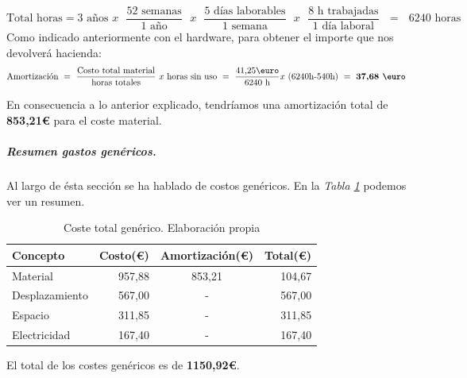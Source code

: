 \documentclass[12pt]{article}
\begin{document}
\begin{itemize}
         \begin{equation*}
                \text{Total horas} = \text{3 años }  x\text{ }  \frac{\text{52 semanas}}{\text{1 año}} \text{ }x\text{ } \frac{\text{5 días laborables}}{\text{1 semana}} \text{ }x\text{ } \frac{\text{8 h trabajadas}}{\text{1 día laboral}} \text{ }=\text{ } 6240 \text{ horas} 
            \end{equation*}
            Como indicado anteriormente con el hardware, para obtener el importe que nos devolverá hacienda:
            \begin{equation*}
                \text{Amortización } = \text{ }  \frac{\text{Costo total material}}{\text{horas totales}}\text{ }x\text{ horas sin uso} \text{ }=\text{ } \frac{\text{41,25\euro}}{\text{6240 h}}x\text{ (6240h-540h)} \text{ }= \text{ \textbf{37,68 \euro}}
            \end{equation*}
    \end{itemize}
    En consecuencia a lo anterior explicado, tendríamos una amortización total de \textbf{853,21\euro} para el coste material.
    
    

    \subparagraph{Resumen gastos genéricos.} Al largo de ésta sección se ha hablado de costos genéricos. En la \textit{Tabla \ref{tab:costos_genericos}} podemos ver un resumen.
        \begin{table}[H]
        \begin{center}
            \begin{tabular}{ |l|r|c|r| } \hline
                Concepto       & Costo(\euro) & Amortización(\euro) & Total(\euro)     \\ \hline
                Material       & 957,88       & 853,21              & 104,67             \\ \hline
                Desplazamiento & 567,00       & -                & 567,00            \\ \hline
                Espacio        & 311,85       & -                & 311,85            \\ \hline
                Electricidad   & 167,40       & -                & 167,40           \\ \hline
            \end{tabular}
        \caption{Coste total genérico. Elaboración propia}
        \label{tab:costos_genericos}
        \end{center}
        \end{table}
    El total de los costes genéricos es de \textbf{1150,92\euro}.
\end{document}
